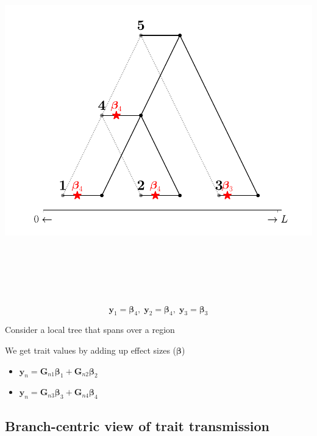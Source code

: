 \documentclass[
  letterpaper,
  DIV=11,
  numbers=noendperiod]{scrartcl}
\providecommand{\tightlist}{%
  \setlength{\itemsep}{0pt}\setlength{\parskip}{0pt}}\usepackage{longtable,booktabs,array}
\begin{document}
\includegraphics[width=\linewidth,height=6.25in,keepaspectratio]{slides_files/mediabag/imgs/tree-1.pdf}
\[
\mathbf{y}_1=\boldsymbol{\beta}_4, \;
\mathbf{y}_2=\boldsymbol{\beta}_4, \;
\mathbf{y}_3 = \boldsymbol{\beta}_3
\]

Consider a local tree that spans over a region

We get trait values by adding up effect sizes (\(\boldsymbol{\beta}\))

\begin{itemize}
\tightlist
\item
  \(\mathbf{y}_n = \mathbf{G}_{n1} \boldsymbol{\beta}_1 + \mathbf{G}_{n2} \boldsymbol{\beta}_2\)
\end{itemize}

\begin{itemize}
\tightlist
\item
  \(\mathbf{y}_n = \mathbf{G}_{n3} \boldsymbol{\beta}_3 + \mathbf{G}_{n4} \boldsymbol{\beta}_4\)
\end{itemize}

\subsection{Branch-centric view of trait
transmission}\label{branch-centric-view-of-trait-transmission}
\end{document}
